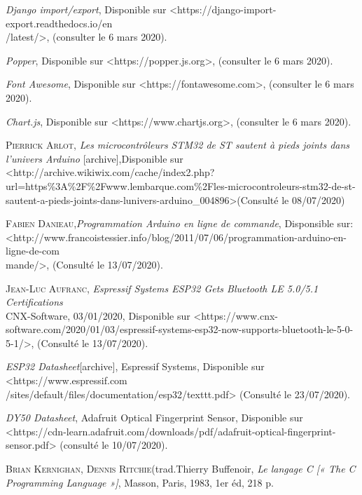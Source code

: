 \begin{thebibliography}{2}
         \emph{Django import/export}, Disponible sur <https://django-import-
        export.readthedocs.io/en\\/latest/>, (consulter le 6 mars 2020). 
        
         \emph{Popper}, Disponible sur <https://popper.js.org>, (consulter le 6 mars 2020).
        
         \emph{Font Awesome}, Disponible sur <https://fontawesome.com>, (consulter le 6 mars 2020).
        
         \emph{Chart.js}, Disponible sur <https://www.chartjs.org>, (consulter le 6 mars 2020).
    
         \textsc{Pierrick Arlot}, \emph {Les microcontrôleurs STM32 de ST sautent à pieds joints dans l’univers Arduino }[archive],Disponible sur <http://archive.wikiwix.com/cache/index2.php?url=https\%3A\%2F\%2Fwww.lembarque.com\%2Fles-microcontroleurs-stm32-de-st-sautent-a-pieds-joints-dans-lunivers-arduino\_004896>(Consulté le 08/07/2020)

         \textsc{Fabien Danieau},\emph{Programmation Arduino en ligne de commande}, Disponsible sur: \\<http://www.francoistessier.info/blog/2011/07/06/programmation-arduino-en-ligne-de-com\\mande/>, (Consulté le 13/07/2020).
        
          \textsc{Jean-Luc Aufranc}, \emph{Espressif Systems ESP32 Gets Bluetooth LE 5.0/5.1 Certifications}\\ CNX-Software, 03/01/2020, Disponible sur <https://www.cnx-software.com/2020/01/03/espressif-systems-esp32-now-supports-bluetooth-le-5-0-5-1/>, (Consulté le 13/07/2020).
       
         \emph{ESP32 Datasheet}[archive], Espressif Systems, Disponible sur <https://www.espressif.com\\/sites/default/files/documentation/esp32/texttt.pdf> (Consulté le  23/07/2020).
        
         \emph{DY50 Datasheet}, Adafruit Optical Fingerprint Sensor, Disponible sur <https://cdn-learn.adafruit.com/downloads/pdf/adafruit-optical-fingerprint-sensor.pdf> (consulté le 10/07/2020).
     

         \textsc{Brian Kernighan}, \textsc{Dennis Ritchie}(trad.Thierry Buffenoir, \emph{Le langage C [« The C Programming Language »]}, Masson, Paris, 1983, 1er éd, 218 p.
        

\end{thebibliography}
